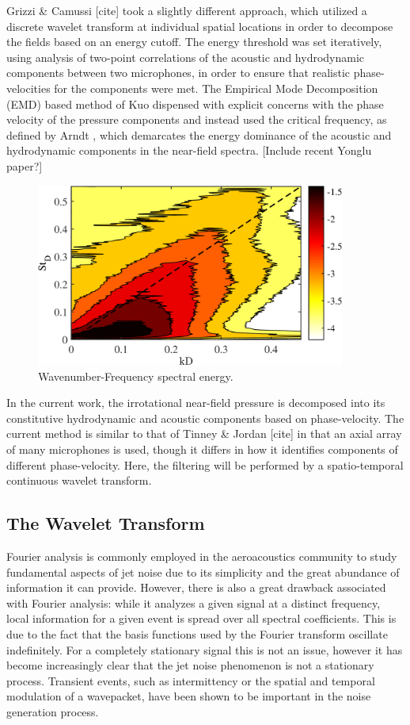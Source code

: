 Grizzi \& Camussi [cite] took a slightly different approach, which utilized a discrete wavelet transform at individual spatial locations in order to decompose the fields based on an energy cutoff. 
The energy threshold was set iteratively, using analysis of two-point correlations of the acoustic and hydrodynamic components between two microphones, in order to ensure that realistic phase-velocities for the components were met. 
The Empirical Mode Decomposition (EMD) based method of Kuo \etal [cite] dispensed with explicit concerns with the phase velocity of the pressure components and instead used the critical frequency, as defined by Arndt \etal [cite], which demarcates the energy dominance of the acoustic and hydrodynamic components in the near-field spectra.
[Include recent Yonglu paper?]
\begin{figure}
	\centering
	\includegraphics[width=4in]{Figures/Phase_Velocity_Map.png}
	\caption{Wavenumber-Frequency spectral energy.}
	\label{fig:phase_velocity_map}
\end{figure}

In the current work, the irrotational near-field pressure is decomposed into its constitutive hydrodynamic and acoustic components based on phase-velocity. 
The current method is similar to that of Tinney \& Jordan [cite] in that an axial array of many microphones is used, though it differs in how it identifies components of different phase-velocity.
Here, the filtering will be performed by a spatio-temporal continuous wavelet transform.

\subsection{The Wavelet Transform}
Fourier analysis is commonly employed in the aeroacoustics community to study fundamental aspects of jet noise due to its simplicity and the great abundance of information it can provide. 
However, there is also a great drawback associated with Fourier analysis: while it analyzes a given signal at a distinct frequency, local information for a given event is spread over all spectral coefficients. 
This is due to the fact that the basis functions used by the Fourier transform oscillate indefinitely. 
For a completely stationary signal this is not an issue, however it has become increasingly clear that the jet noise phenomenon is not a stationary process.
Transient events, such as intermittency or the spatial and temporal modulation of a wavepacket, have been shown to be important in the noise generation process. 

